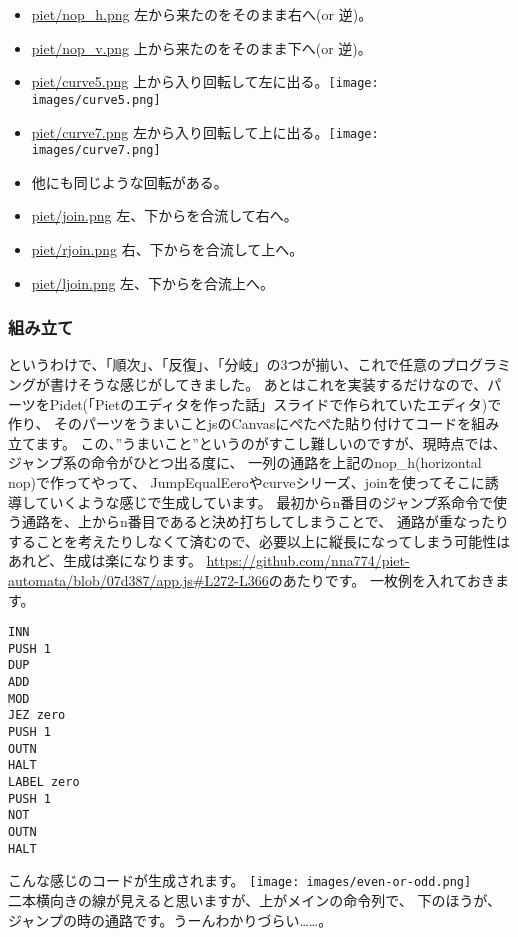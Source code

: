 \documentclass[twocolumn,8pt,b5paper]{extarticle}
\begin{document}
\begin{itemize}
\setlength{\parskip}{0cm}
\setlength{\itemsep}{0cm}
\item \href{https://github.com/nna774/piet-automata/blob/master/piet/nop\_h.png}{piet/nop\_h.png} 左から来たのをそのまま右へ(or 逆)。
\item \href{https://github.com/nna774/piet-automata/blob/master/piet/nop\_v.png}{piet/nop\_v.png} 上から来たのをそのまま下へ(or 逆)。
\item \href{https://github.com/nna774/piet-automata/blob/master/piet/curve5.png}{piet/curve5.png} 上から入り回転して左に出る。\texttt{[image: images/curve5.png]}
\item \href{https://github.com/nna774/piet-automata/blob/master/piet/curve7.png}{piet/curve7.png} 左から入り回転して上に出る。\texttt{[image: images/curve7.png]}
\item 他にも同じような回転がある。
\item \href{https://github.com/nna774/piet-automata/blob/master/piet/join.png}{piet/join.png} 左、下からを合流して右へ。
\item \href{https://github.com/nna774/piet-automata/blob/master/piet/rjoin.png}{piet/rjoin.png} 右、下からを合流して上へ。
\item \href{https://github.com/nna774/piet-automata/blob/master/piet/ljoin.png}{piet/ljoin.png} 左、下からを合流上へ。
\end{itemize}

\subsubsection{組み立て}
というわけで、「順次」、「反復」、「分岐」の3つが揃い、これで任意のプログラミングが書けそうな感じがしてきました。
あとはこれを実装するだけなので、パーツをPidet(「Pietのエディタを作った話」スライドで作られていたエディタ)で作り、
そのパーツをうまいことjsのCanvasにぺたぺた貼り付けてコードを組み立てます。
この、”うまいこと”というのがすこし難しいのですが、現時点では、ジャンプ系の命令がひとつ出る度に、
一列の通路を上記のnop\_h(horizontal nop)で作ってやって、
JumpEqualEeroやcurveシリーズ、joinを使ってそこに誘導していくような感じで生成しています。
最初からn番目のジャンプ系命令で使う通路を、上からn番目であると決め打ちしてしまうことで、
通路が重なったりすることを考えたりしなくて済むので、必要以上に縦長になってしまう可能性はあれど、生成は楽になります。
\url{https://github.com/nna774/piet-automata/blob/07d387/app.js#L272-L366}のあたりです。
一枚例を入れておきます。
\begin{lstlisting}[frame=single]
INN
PUSH 1
DUP
ADD
MOD
JEZ zero
PUSH 1
OUTN
HALT
LABEL zero
PUSH 1
NOT
OUTN
HALT
\end{lstlisting}
こんな感じのコードが生成されます。
\texttt{[image: images/even-or-odd.png]}\\
二本横向きの線が見えると思いますが、上がメインの命令列で、
下のほうが、ジャンプの時の通路です。うーんわかりづらい……。
\end{document}
